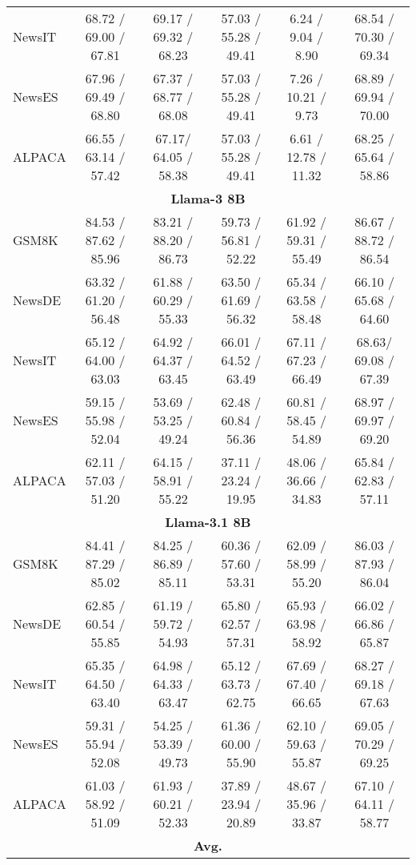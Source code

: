 \begin{table*}[tb]
{\begin{tabular}{lccccc}
\\
    NewsIT & 68.72 / 69.00  / 67.81& 69.17 / 69.32  / 68.23& 57.03 / 55.28  / 49.41& 6.24 / 9.04  / 8.90& 68.54 / 70.30  / 69.34
\\
    NewsES & 67.96 / 69.49  / 68.80& 67.37 / 68.77  / 68.08& 57.03 / 55.28  / 49.41& 7.26 / 10.21  / 9.73& 68.89 / 69.94  / 70.00
\\
    ALPACA & 66.55 / 63.14  / 57.42& 67.17/ 64.05  / 58.38& 57.03 / 55.28  / 49.41& 6.61 / 12.78  / 11.32& 68.25 / 65.64  / 58.86\\
    \bottomrule
    \multicolumn{6}{c}{\textbf{Llama-3 8B}} \\
    GSM8K & 84.53 / 87.62  / 85.96& 83.21 / 88.20  / 86.73& 59.73 / 56.81  / 52.22& 61.92 / 59.31  / 55.49& 86.67 / 88.72  / 86.54\\
    NewsDE & 63.32 / 61.20  / 56.48& 61.88 / 60.29  / 55.33& 63.50 / 61.69  / 56.32& 65.34 / 63.58 / 58.48& 66.10 / 65.68  / 64.60
\\
    NewsIT & 65.12 / 64.00  / 63.03& 64.92 / 64.37  / 63.45& 66.01 / 64.52  / 63.49& 67.11 / 67.23  / 66.49& 68.63/ 69.08  / 67.39
\\
    NewsES & 59.15 / 55.98  / 52.04& 53.69 / 53.25  / 49.24& 62.48 / 60.84  / 56.36& 60.81 / 58.45  / 54.89& 68.97 / 69.97  / 69.20
\\
    ALPACA & 62.11 / 57.03  / 51.20& 64.15 / 58.91  / 55.22& 37.11 / 23.24  / 19.95& 48.06 / 36.66  / 34.83& 65.84 / 62.83  / 57.11\\
    \bottomrule
    \multicolumn{6}{c}{\textbf{Llama-3.1 8B}} \\
    GSM8K & 84.41 / 87.29  / 85.02& 84.25 / 86.89  / 85.11& 60.36 / 57.60  / 53.31& 62.09 / 58.99  / 55.20& 86.03 / 87.93  / 86.04\\
    NewsDE & 62.85 / 60.54  / 55.85& 61.19 / 59.72  / 54.93& 65.80 / 62.57  / 57.31& 65.93 / 63.98  / 58.92& 66.02 / 66.86  / 65.87
\\
    NewsIT & 65.35 / 64.50  / 63.40& 64.98 / 64.33  / 63.47& 65.12 / 63.73  / 62.75& 67.69 / 67.40  / 66.65& 68.27 / 69.18  / 67.63
\\
    NewsES & 59.31 / 55.94  / 52.08& 54.25 / 53.39  / 49.73& 61.36 / 60.00  / 55.90& 62.10 / 59.63  / 55.87& 69.05 / 70.29  / 69.25
\\
    ALPACA & 61.03 / 58.92  / 51.09& 61.93 / 60.21  / 52.33& 37.89 / 23.94  / 20.89& 48.67 / 35.96  / 33.87& 67.10 / 64.11  / 58.77\\
    \bottomrule
    \multicolumn{6}{c}{\textbf{Avg.}} \\

\end{tabular}}
\end{table*}
